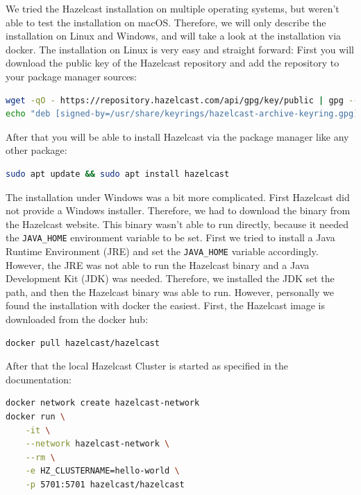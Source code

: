 We tried the Hazelcast installation on multiple operating systems, but weren't
able to test the installation on macOS. Therefore, we will only describe the
installation on Linux and Windows, and will take a look at the installation via
docker. The installation on Linux is very easy and straight forward: First you
will download the public key of the Hazelcast repository and add the repository
to your package manager sources:
\begin{lstlisting}[language=bash,caption={Adding the Hazelcast repository to the package manager sources under Linux (Debian) \parencite{hazelcast_installing_nodate}}]
wget -qO - https://repository.hazelcast.com/api/gpg/key/public | gpg --dearmor | sudo tee /usr/share/keyrings/hazelcast-archive-keyring.gpg > /dev/null
echo "deb [signed-by=/usr/share/keyrings/hazelcast-archive-keyring.gpg] https://repository.hazelcast.com/debian stable main" | sudo tee -a /etc/apt/sources.list
\end{lstlisting}
After that you will be able to install Hazelcast via the package manager like
any other package:
\begin{lstlisting}[language=bash,caption={Installing Hazelcast under Linux (Debian) \parencite{hazelcast_installing_nodate}}]
sudo apt update && sudo apt install hazelcast
\end{lstlisting}
The installation under Windows was a bit more complicated. First
Hazelcast did not provide a Windows installer. Therefore, we had to download the
binary from the Hazelcast website. This binary wasn't able to run directly,
because it needed the \texttt{JAVA\_HOME} environment variable to be set. First we
tried to install a Java Runtime Environment (JRE) and set the \texttt{JAVA\_HOME}
variable accordingly. However, the JRE was not able to run the Hazelcast binary
and a Java Development Kit (JDK) was needed. Therefore, we installed the JDK set
the path, and then the Hazelcast binary was able to run. However, personally we
found the installation with docker the easiest. 
First, the Hazelcast image is downloaded from the docker hub:
\begin{lstlisting}[language=bash,caption={Downloading the Hazelcast image from the docker hub \parencite{hazelcast_installing_nodate}}]
docker pull hazelcast/hazelcast
\end{lstlisting}
After that the local Hazelcast Cluster is started as specified in the
documentation:
\begin{lstlisting}[language=bash,caption={Starting the Hazelcast Cluster using the docker image \parencite{hazelcast_start_2023}}]
docker network create hazelcast-network
docker run \
    -it \
    --network hazelcast-network \
    --rm \
    -e HZ_CLUSTERNAME=hello-world \
    -p 5701:5701 hazelcast/hazelcast
\end{lstlisting}

